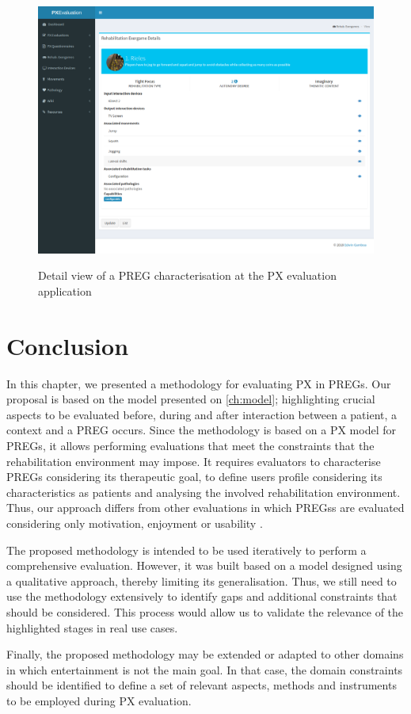 \begin{figure}[bth]
\myfloatalign
{\includegraphics[width=\linewidth]{gfx/app/characterisingApp}} \quad
\caption{Detail view of a \ac{PREG} characterisation at the \ac{PX} evaluation application}\label{fig:characterisingApp}
\end{figure}

\section{Conclusion}
In this chapter, we presented a methodology for evaluating PX in \acp{PREG}. Our proposal is based on the model presented on \autoref{ch:model}; highlighting crucial aspects to be evaluated before, during and after interaction between a patient, a context and a \ac{PREG} occurs. Since the methodology is based on a \ac{PX} model for \acp{PREG}, it allows performing evaluations that meet the constraints that the rehabilitation environment may impose. It requires evaluators to characterise \acp{PREG} considering its therapeutic goal, to define users profile considering its characteristics as patients and analysing the involved rehabilitation environment. Thus, our approach differs from other evaluations in which \acp{PREG}s are evaluated considering only motivation, enjoyment or usability \autocite{Brokaw2015,Burke2009,Cameirao2010,jansen2013serious,Ni2014}.

The proposed methodology is intended to be used iteratively to perform a comprehensive evaluation. However, it was built based on a model designed using a qualitative approach, thereby limiting its generalisation. Thus, we still need to use the methodology extensively to identify gaps and additional constraints that should be considered. This process would allow us to validate the relevance of the highlighted stages in real use cases.

Finally, the proposed methodology may be extended or adapted to other domains in which entertainment is not the main goal. In that case, the domain constraints should be identified to define a set of relevant aspects, methods and instruments to be employed during \ac{PX} evaluation.
